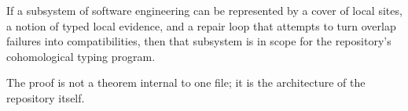 \begin{proposition}
If a subsystem of software engineering can be represented by a cover of local sites, a notion
of typed local evidence, and a repair loop that attempts to turn overlap failures into
compatibilities, then that subsystem is in scope for the repository's cohomological typing
program.
\end{proposition}

The proof is not a theorem internal to one file; it is the architecture of the repository
itself.
